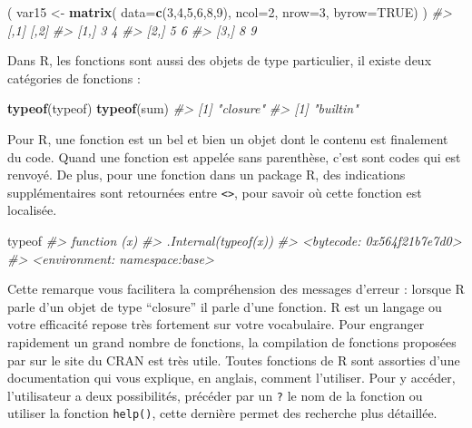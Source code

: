 \documentclass[]{article}
\newenvironment{Shaded}{\begin{snugshade}}{\end{snugshade}}
\newcommand{\CommentTok}[1]{\textcolor[rgb]{0.56,0.35,0.01}{\textit{#1}}}
\newcommand{\DataTypeTok}[1]{\textcolor[rgb]{0.13,0.29,0.53}{#1}}
\newcommand{\DecValTok}[1]{\textcolor[rgb]{0.00,0.00,0.81}{#1}}
\newcommand{\KeywordTok}[1]{\textcolor[rgb]{0.13,0.29,0.53}{\textbf{#1}}}
\newcommand{\NormalTok}[1]{#1}
\newcommand{\OtherTok}[1]{\textcolor[rgb]{0.56,0.35,0.01}{#1}}
\newcommand{\StringTok}[1]{\textcolor[rgb]{0.31,0.60,0.02}{#1}}
\begin{document}
\begin{Shaded}
\begin{Highlighting}[]
\NormalTok{(}
\NormalTok{  var15 <-}\StringTok{ }\KeywordTok{matrix}\NormalTok{(}
    \DataTypeTok{data=}\KeywordTok{c}\NormalTok{(}\DecValTok{3}\NormalTok{,}\DecValTok{4}\NormalTok{,}\DecValTok{5}\NormalTok{,}\DecValTok{6}\NormalTok{,}\DecValTok{8}\NormalTok{,}\DecValTok{9}\NormalTok{),}
    \DataTypeTok{ncol=}\DecValTok{2}\NormalTok{,}
    \DataTypeTok{nrow=}\DecValTok{3}\NormalTok{,}
    \DataTypeTok{byrow=}\OtherTok{TRUE}\NormalTok{)}
\NormalTok{)}
\CommentTok{#>      [,1] [,2]}
\CommentTok{#> [1,]    3    4}
\CommentTok{#> [2,]    5    6}
\CommentTok{#> [3,]    8    9}
\end{Highlighting}
\end{Shaded}

Dans R, les fonctions sont aussi des objets de type particulier, il existe deux catégories de fonctions :

\begin{Shaded}
\begin{Highlighting}[]
\KeywordTok{typeof}\NormalTok{(typeof)}
\KeywordTok{typeof}\NormalTok{(sum)}
\CommentTok{#> [1] "closure"}
\CommentTok{#> [1] "builtin"}
\end{Highlighting}
\end{Shaded}

Pour R, une fonction est un bel et bien un objet dont le contenu est finalement du code. Quand une fonction est appelée sans parenthèse, c'est sont codes qui est renvoyé. De plus, pour une fonction dans un package R, des indications supplémentaires sont retournées entre \texttt{<>}, pour savoir où cette fonction est localisée.

\begin{Shaded}
\begin{Highlighting}[]
\NormalTok{typeof}
\CommentTok{#> function (x) }
\CommentTok{#> .Internal(typeof(x))}
\CommentTok{#> <bytecode: 0x564f21b7e7d0>}
\CommentTok{#> <environment: namespace:base>}
\end{Highlighting}
\end{Shaded}

Cette remarque vous facilitera la compréhension des messages d'erreur : lorsque
R parle d'un objet de type ``closure'' il parle d'une fonction. R est un langage
ou votre efficacité repose très fortement sur votre vocabulaire. Pour engranger
rapidement un grand nombre de fonctions, la compilation de fonctions proposées
par sur le site du CRAN est très utile. Toutes fonctions de R sont assorties
d'une documentation qui vous explique, en anglais, comment l'utiliser. Pour y
accéder, l'utilisateur a deux possibilités, précéder par un \texttt{?} le nom de
la fonction ou utiliser la fonction \texttt{help()}, cette dernière permet des
recherche plus détaillée.
\end{document}
